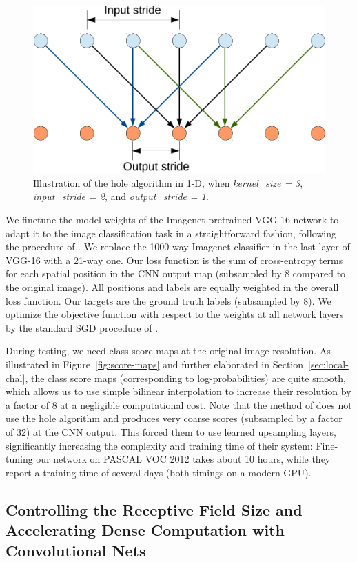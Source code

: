 \begin{figure}
  \centering
  \includegraphics[width=0.5\linewidth]{fig/atrous2.pdf}
  \caption{Illustration of the hole algorithm in 1-D, when
    \textsl{kernel\_size = 3}, \textsl{input\_stride = 2},
    and \textsl{output\_stride = 1}.}
  \label{fig:hole}
\end{figure}


We finetune the model weights of the Imagenet-pretrained VGG-16 network to
adapt it to the image classification task in a straightforward fashion,
following the procedure of \citet{long2014fully}. We replace the 1000-way
Imagenet classifier in the last layer of VGG-16 with a 21-way one. Our loss
function is the sum of cross-entropy terms for each spatial position in the
CNN output map (subsampled by 8 compared to the original image). All positions
and labels are equally weighted in the overall loss function. Our targets are
the ground truth labels (subsampled by 8). We optimize the objective function
with respect to the weights at all network layers by the standard SGD
procedure of \citet{KrizhevskyNIPS2013}.

During testing, we need class score maps at the original image resolution. As
illustrated in Figure~\ref{fig:score-maps} and further elaborated in
Section~\ref{sec:local-chal}, the class score maps (corresponding to
log-probabilities) are quite smooth, which allows us to use simple bilinear
interpolation to increase their resolution by a factor of 8 at a negligible
computational cost. Note that the method of \citet{long2014fully} does not use
the hole algorithm and produces very coarse scores (subsampled by a factor of
32) at the CNN output. This forced them to use learned upsampling layers,
significantly increasing the complexity and training time of their system:
Fine-tuning our network on PASCAL VOC 2012 takes about 10 hours, while
they report a training time of several days (both timings on a modern GPU).

\subsection{Controlling the Receptive Field Size and Accelerating Dense Computation
  with Convolutional Nets}
\label{sec:convnet-field}


